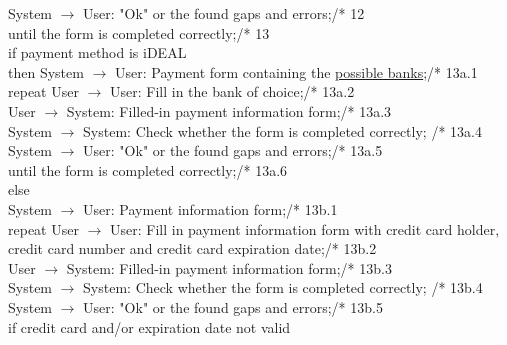 \phantom{x}\hspace{7mm} System $\rightarrow$ User: "Ok" or the found gaps and errors;\hfill /* 12\\
until the form is completed correctly;\hfill /* 13\\
if payment method is iDEAL\\
then System $\rightarrow$ User: Payment form containing the \underline{possible banks};\hfill /* 13a.1\\
\phantom{x}\hspace{7mm} repeat User $\rightarrow$ User: Fill in the bank of choice;\hfill /* 13a.2\\
\phantom{x}\hspace{14mm} User $\rightarrow$ System: Filled-in payment information form;\hfill /* 13a.3\\
\phantom{x}\hspace{14mm} System $\rightarrow$ System: Check whether the form is completed correctly; \hfill /* 13a.4\\
\phantom{x}\hspace{14mm} System $\rightarrow$ User: "Ok" or the found gaps and errors;\hfill /* 13a.5\\
\phantom{x}\hspace{7mm} until the form is completed correctly;\hfill /* 13a.6\\
else\\
\phantom{x}\hspace{7mm} System $\rightarrow$ User: Payment information form;\hfill /* 13b.1\\
\phantom{x}\hspace{7mm} repeat User $\rightarrow$ User: Fill in payment information form with credit card holder, credit card number and credit card expiration date;\hfill /* 13b.2\\
\phantom{x}\hspace{14mm} User $\rightarrow$ System: Filled-in payment information form;\hfill /* 13b.3\\
\phantom{x}\hspace{14mm} System $\rightarrow$ System: Check whether the form is completed correctly; \hfill /* 13b.4\\
\phantom{x}\hspace{14mm} System $\rightarrow$ User: "Ok" or the found gaps and errors;\hfill /* 13b.5\\
\phantom{x}\hspace{14mm} if credit card and/or expiration date not valid\\
